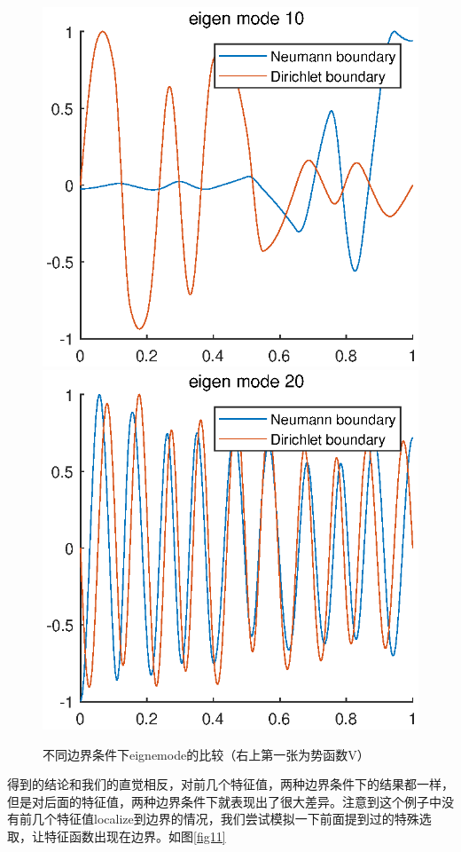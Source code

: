 \documentclass[UTF8,12pt]{article}
\begin{document}
\begin{figure}[htbp]
    \includegraphics[width=0.24\linewidth]{pic/mei10}
    \includegraphics[width=0.24\linewidth]{pic/mei20}
    \label{fig10}
\caption{不同边界条件下eignemode的比较（右上第一张为势函数V）}
\end{figure}

得到的结论和我们的直觉相反，对前几个特征值，两种边界条件下的结果都一样，但是对后面的特征值，两种边界条件下就表现出了很大差异。注意到这个例子中没有前几个特征值localize到边界的情况，我们尝试模拟一下前面提到过的特殊选取，让特征函数出现在边界。如图\ref{fig11}
\end{document}
